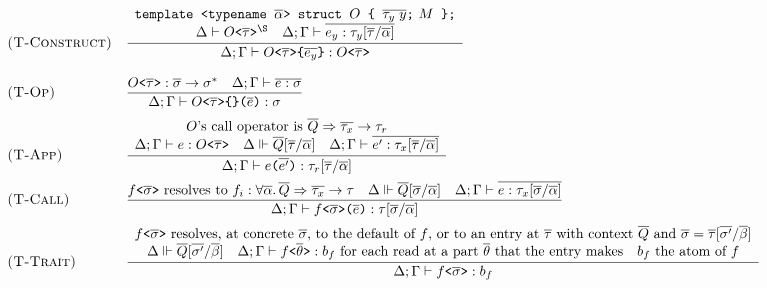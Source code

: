 \begin{figure}[htbp]
\[
\begin{array}{@{}l@{\quad}l@{}}
\textsc{(T-Construct)} & \dfrac{\begin{array}{c} \texttt{template <typename }\overline{\alpha}\texttt{> struct } O \texttt{ \{ } \overline{\tau_y\; y}\texttt{;}\ M \texttt{ \};} \\ \Delta \vdash O\texttt{<}\overline{\tau}\texttt{>}^{\S} \quad \Delta; \Gamma \vdash \overline{e_y : \tau_y[\overline{\tau}/\overline{\alpha}]} \end{array}}{\Delta; \Gamma \vdash O\texttt{<}\overline{\tau}\texttt{>\{}\overline{e_y}\texttt{\}} : O\texttt{<}\overline{\tau}\texttt{>}}
\\[18pt]
\textsc{(T-Op)} & \dfrac{O\texttt{<}\overline{\tau}\texttt{>} : \overline{\sigma} \to \sigma^{\ast} \quad \Delta; \Gamma \vdash \overline{e : \sigma}}{\Delta; \Gamma \vdash O\texttt{<}\overline{\tau}\texttt{>\{\}(}\overline{e}\texttt{)} : \sigma}
\\[12pt]
\textsc{(T-App)} & \dfrac{\begin{array}{c} O\text{'s call operator is } \overline{Q} \Rightarrow \overline{\tau_x} \to \tau_r \\ \Delta; \Gamma \vdash e : O\texttt{<}\overline{\tau}\texttt{>} \quad \Delta \Vdash \overline{Q}[\overline{\tau}/\overline{\alpha}] \quad \Delta; \Gamma \vdash \overline{e' : \tau_x[\overline{\tau}/\overline{\alpha}]} \end{array}}{\Delta; \Gamma \vdash e\texttt{(}\overline{e'}\texttt{)} : \tau_r[\overline{\tau}/\overline{\alpha}]}
\\[12pt]
\textsc{(T-Call)} & \dfrac{f\texttt{<}\overline{\sigma}\texttt{>} \text{ resolves to } f_i : \forall\overline{\alpha}.\,\overline{Q} \Rightarrow \overline{\tau_x} \to \tau \quad \Delta \Vdash \overline{Q}[\overline{\sigma}/\overline{\alpha}] \quad \Delta; \Gamma \vdash \overline{e : \tau_x[\overline{\sigma}/\overline{\alpha}]}}{\Delta; \Gamma \vdash f\texttt{<}\overline{\sigma}\texttt{>(}\overline{e}\texttt{)} : \tau[\overline{\sigma}/\overline{\alpha}]}
\\[12pt]
\textsc{(T-Trait)} & \dfrac{\begin{array}{c} f\texttt{<}\overline{\sigma}\texttt{>} \text{ resolves, at concrete } \overline{\sigma} \text{, to the default of } f \text{, or to an entry at } \overline{\tau} \text{ with context } \overline{Q} \text{ and } \overline{\sigma} = \overline{\tau}[\overline{\sigma'}/\overline{\beta}] \\ \Delta \Vdash \overline{Q}[\overline{\sigma'}/\overline{\beta}] \quad \Delta; \Gamma \vdash f\texttt{<}\overline{\theta}\texttt{>} : b_f \text{ for each read at a part } \overline{\theta} \text{ that the entry makes} \quad b_f \text{ the atom of } f \end{array}}{\Delta; \Gamma \vdash f\texttt{<}\overline{\sigma}\texttt{>} : b_f}

\end{array}\]
\end{figure}
